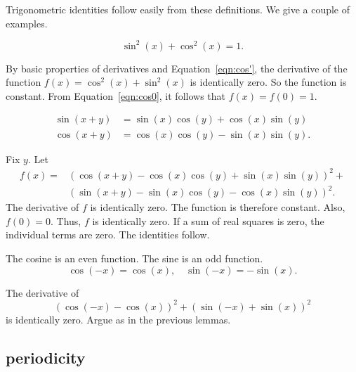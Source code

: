 Trigonometric identities follow easily from these definitions.  We
give a couple of examples.

\begin{lemma}\label{lemma:circle} 
   $$\sin^2(x) + \cos^2(x) = 1.$$
\end{lemma}

\begin{proved}
By basic properties of derivatives and Equation~\ref{eqn:cos'},
the derivative of the function $f(x) = \cos^2(x) +\sin^2(x)$ is
identically zero.   So the function is constant.  From
Equation~\ref{eqn:cos0}, it follows that $f(x)=f(0)=1$.
\swallowed\end{proved}


\begin{lemma}\label{lemma:sin-add}
  $$\begin{array}{lll}
  \sin(x+y) &= \sin(x)\cos(y) + \cos(x)\sin(y)\\
  \cos(x+y)  &= \cos(x)\cos(y) - \sin(x)\sin(y).
  \end{array}$$
\end{lemma}

\begin{proved}
Fix $y$.  Let
    $$\begin{array}{lll}
    f(x) = &(\cos(x+y) - \cos(x)\cos(y) +
    \sin(x)\sin(y))^2 +\\ & (\sin(x+y) -\sin(x)\cos(y) -
    \cos(x)\sin(y))^2.
    \end{array}$$
The derivative of $f$ is identically zero.  The function is
therefore constant. Also, $f(0)=0$.  Thus, $f$ is identically zero.
If a sum of real squares is zero, the individual terms are zero. The
identities follow.
\swallowed\end{proved}

\begin{lemma}\label{lemma:cos-neg}
The cosine is an even function.  The sine is an odd
function.
    $$\cos(-x) = \cos(x),\quad\sin(-x) = -\sin(x).$$
\end{lemma}

\begin{proved}
The derivative of
    $$(\cos(-x) - \cos(x))^2 + (\sin(-x) +\sin(x))^2$$
is identically zero.  Argue as in the previous lemmas.
\swallowed\end{proved}

\subsection{periodicity}
\label{sec:pi}

